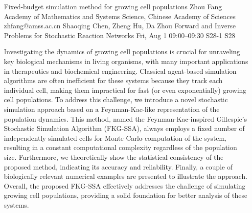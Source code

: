 \begin{talk}
  {Fixed-budget simulation method for growing cell populations}%
  {Zhou Fang}%
  {Academy of Mathematics and Systems Science, Chinese Academy of Sciences}%
  {zhfang@amss.ac.cn}%
  {Shaoqing Chen, Zheng Hu, Da Zhou}%
  {Forward and Inverse Problems for Stochastic Reaction Networks}%
  {Fri, Aug 1 09:00--09:30}%
  {S28-1}%
  {S28}%
    
   
Investigating the dynamics of growing cell populations is crucial for unraveling key biological mechanisms in living organisms, with many important applications in therapeutics and biochemical engineering. Classical agent-based simulation algorithms are often inefficient for these systems because
they track each individual cell, making them impractical for fast (or even exponentially) growing
cell populations. To address this challenge, we introduce a novel stochastic simulation approach
based on a Feynman-Kac-like representation of the population dynamics. This method, named the
Feynman-Kac-inspired Gillespie’s Stochastic Simulation Algorithm (FKG-SSA), always employs a
fixed number of independently simulated cells for Monte Carlo computation of the system, resulting in a constant computational complexity regardless of the population size. Furthermore, we
theoretically show the statistical consistency of the proposed method, indicating its accuracy and
reliability. Finally, a couple of biologically relevant numerical examples are presented to illustrate the
approach. Overall, the proposed FKG-SSA effectively addresses the challenge of simulating growing
cell populations, providing a solid foundation for better analysis of these systems.


\end{talk}

